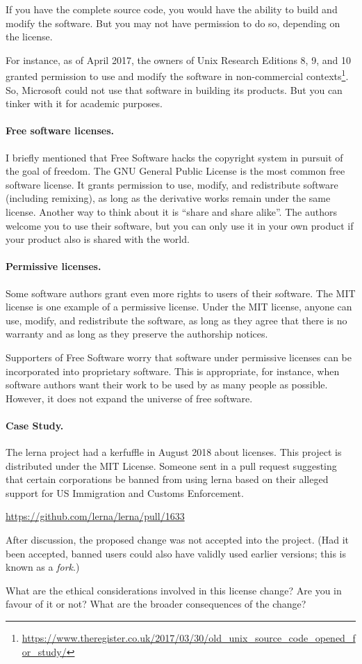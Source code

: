\documentclass[11pt]{article}
\begin{document}
If you have the complete source code, you would have the ability to build
and modify the software. But you may not have permission to do so, depending on
the license.

For instance, as of April 2017, the owners of Unix Research Editions
8, 9, and 10 granted permission to use and modify the software in
non-commercial
contexts\footnote{\url{https://www.theregister.co.uk/2017/03/30/old_unix_source_code_opened_for_study/}}.
So, Microsoft could not use that software in building its
products. But you can tinker with it for academic purposes.

\paragraph{Free software licenses.} I briefly mentioned that Free Software
hacks the copyright system in pursuit of the goal of freedom.  The GNU
General Public License is the most common free software license.  It
grants permission to use, modify, and redistribute software (including
remixing), as long as the derivative works remain under the same license.
Another way to think about it is ``share and share alike''. The authors
welcome you to use their software, but you can only use it in your own product
if your product also is shared with the world.

\paragraph{Permissive licenses.} Some software authors grant even more rights to users of their software.
The MIT license is one example of a permissive license. Under the MIT
license, anyone can use, modify, and redistribute the software, as
long as they agree that there is no warranty and as long as they
preserve the authorship notices.

Supporters of Free Software worry that software under permissive licenses can be
incorporated into proprietary software. This is appropriate, for instance, when
software authors want their work to be used by as many people as possible.
However, it does not expand the universe of free software.

\paragraph{Case Study.} The lerna project had a kerfuffle in August 2018 about licenses.
This project is distributed under the MIT License. Someone sent in a pull request
suggesting that certain corporations be banned from using lerna based on their
alleged support for US Immigration and Customs Enforcement.

\begin{center}
  \url{https://github.com/lerna/lerna/pull/1633}
\end{center}

After discussion, the proposed change was not accepted into the project. (Had it been
accepted, banned users could also have validly used earlier versions; this is known as a
\emph{fork}.)

What are the ethical considerations involved in this license change? Are you in favour of it
or not? What are the broader consequences of the change?
\end{document}
